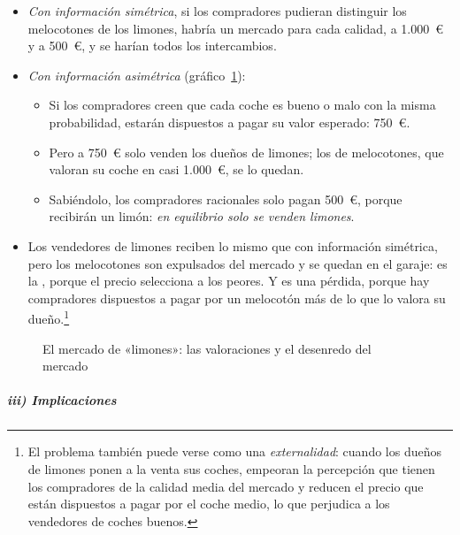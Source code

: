 \documentclass[11pt]{article}
\begin{document}
\begin{itemize}
\item \emph{Con información simétrica}, si los compradores pudieran distinguir los melocotones de los limones, habría un mercado para cada calidad, a 1.000~€ y a 500~€, y se harían todos los intercambios.
\item \emph{Con información asimétrica} (gráfico~\ref{fig:akerlof}):
  \begin{itemize}
  \item Si los compradores creen que cada coche es bueno o malo con la misma probabilidad, estarán dispuestos a pagar su valor esperado: 750~€.
  \item Pero a 750~€ solo venden los dueños de limones; los de melocotones, que valoran su coche en casi 1.000~€, se lo quedan.
  \item Sabiéndolo, los compradores racionales solo pagan 500~€, porque recibirán un limón: \emph{en equilibrio solo se venden limones}.
  \end{itemize}
\item Los vendedores de limones reciben lo mismo que con información simétrica, pero los melocotones son expulsados del mercado y se quedan en el garaje: es la , porque el precio selecciona a los peores. Y es una pérdida, porque hay compradores dispuestos a pagar por un melocotón más de lo que lo valora su dueño.\footnote{El problema también puede verse como una \emph{externalidad}: cuando los dueños de limones ponen a la venta sus coches, empeoran la percepción que tienen los compradores de la calidad media del mercado y reducen el precio que están dispuestos a pagar por el coche medio, lo que perjudica a los vendedores de coches buenos.}
\end{itemize}

\begin{figure}[H]
\centering
\caption{El mercado de «limones»: las valoraciones y el desenredo del mercado}\label{fig:akerlof}
\end{figure}

\subparagraph{iii) Implicaciones}
\end{document}
